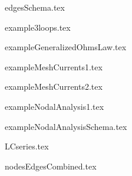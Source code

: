 \begin{frame}{edgesSchema.tex}
\begin{center}

\end{center}
\end{frame}

\begin{frame}{example3loops.tex}
\begin{center}

\end{center}
\end{frame}

\begin{frame}{exampleGeneralizedOhmsLaw.tex}
\begin{center}

\end{center}
\end{frame}

\begin{frame}{exampleMeshCurrents1.tex}
\begin{center}

\end{center}
\end{frame}

\begin{frame}{exampleMeshCurrents2.tex}
\begin{center}

\end{center}
\end{frame}

\begin{frame}{exampleNodalAnalysis1.tex}
\begin{center}

\end{center}
\end{frame}

\begin{frame}{exampleNodalAnalysisSchema.tex}
\begin{center}

\end{center}
\end{frame}

\begin{frame}{LCseries.tex}
\begin{center}

\end{center}
\end{frame}

\begin{frame}{nodesEdgesCombined.tex}
\begin{center}

\end{center}
\end{frame}

